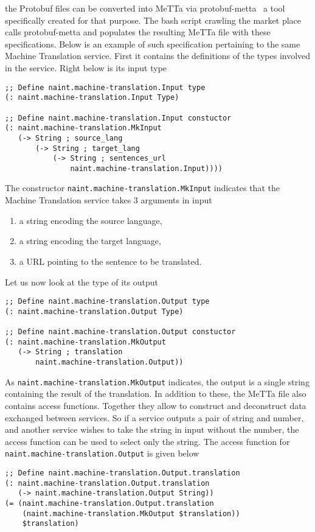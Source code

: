 \documentclass[]{report}
\begin{document}
the Protobuf files can be converted into MeTTa via
protobuf-metta~\cite{ProtoMeTTa} a tool specifically created for that
purpose.  The bash script crawling the market place calls
protobuf-metta and populates the resulting MeTTa file with these
specifications.  Below is an example of such specification pertaining
to the same Machine Translation service.  First it contains the
definitions of the types involved in the service.  Right below is its
input type
\begin{verbatim}
;; Define naint.machine-translation.Input type
(: naint.machine-translation.Input Type)

;; Define naint.machine-translation.Input constuctor
(: naint.machine-translation.MkInput
   (-> String ; source_lang
       (-> String ; target_lang
           (-> String ; sentences_url
               naint.machine-translation.Input))))
\end{verbatim}
The constructor \texttt{naint.machine-translation.MkInput}
indicates that the Machine Translation service takes 3 arguments in
input
\begin{enumerate}
\item a string encoding the source language,
\item a string encoding the target language,
\item a URL pointing to the sentence to be translated.
\end{enumerate}
Let us now look at the type of its output
\begin{verbatim}
;; Define naint.machine-translation.Output type
(: naint.machine-translation.Output Type)

;; Define naint.machine-translation.Output constuctor
(: naint.machine-translation.MkOutput
   (-> String ; translation
       naint.machine-translation.Output))
\end{verbatim}
As \texttt{naint.machine-translation.MkOutput} indicates,
the output is a single string containing the result of the
translation.  In addition to these, the MeTTa file also contains
access functions.  Together they allow to construct and deconstruct
data exchanged between services.  So if a service outputs a pair of
string and number, and another service wishes to take the string in
input without the number, the access function can be used to select
only the string.  The access function for
\texttt{naint.machine-translation.Output} is given below
\begin{verbatim}
;; Define naint.machine-translation.Output.translation
(: naint.machine-translation.Output.translation
   (-> naint.machine-translation.Output String))
(= (naint.machine-translation.Output.translation
    (naint.machine-translation.MkOutput $translation))
    $translation)
\end{verbatim}
\end{document}
